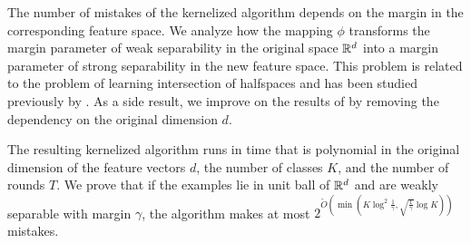 The number of mistakes of the kernelized algorithm depends on the margin in the
corresponding feature space. We analyze how the mapping $\phi$ transforms the
margin parameter of weak separability in the original space $\mathbb{R}^d$ into a margin
parameter of strong separability in the new feature space. This problem is
related to the problem of learning intersection of halfspaces and has been
studied previously by \citet{Klivans-Servedio-2008}. As a side result, we
improve on the results of \citet{Klivans-Servedio-2008} by removing the
dependency on the original dimension $d$.

The resulting kernelized algorithm runs in time that is polynomial in the
original dimension of the feature vectors $d$, the number of classes $K$, and
the number of rounds $T$. We prove that if the examples lie in unit ball of
$\mathbb{R}^d$ and are weakly separable with margin $\gamma$, the algorithm makes at
most $2^{\widetilde{O}(\min(K \log^2 \frac{1}{\gamma}, \sqrt{\frac{1}{\gamma}}
\log K))}$ mistakes.
